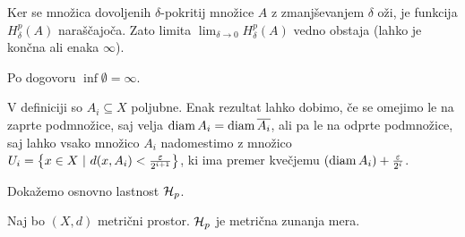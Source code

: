 \begin{opomba}
    Ker se množica dovoljenih \(\delta\)-pokritij množice \(A\) z zmanjševanjem \(\delta\) oži, je funkcija \(H^p_\delta(A)\) naraščajoča. Zato limita \(\lim_{\delta \to 0} H^p_\delta(A)\) vedno obstaja (lahko je končna ali enaka \(\infty\)).
\end{opomba}

\begin{opomba} 
    Po dogovoru \(\inf \emptyset = \infty\).
\end{opomba}

\begin{opomba}
    \label{odp-zap-haus}
    V definiciji so \(A_i \subseteq X\) poljubne. Enak rezultat lahko dobimo, če se omejimo le na zaprte podmnožice, saj velja \(\operatorname{diam} A_i = \operatorname{diam} \overline{A_i}\), ali pa le na odprte podmnožice, saj lahko vsako množico \(A_i\) nadomestimo z množico \(U_i = \left\{x \in X \ | \ d(x, A_i) < \frac{\varepsilon}{2^{i+1}}\right\}\), ki ima premer kvečjemu \((\operatorname{diam} A_i) + \frac{\varepsilon}{2^i}\).
\end{opomba}

Dokažemo osnovno lastnost \(\mathcal{H}_p\).
\begin{trditev}
    \label{haus-m-zun}
    Naj bo \((X, d)\) metrični prostor. \(\mathcal{H}_p\) je metrična zunanja mera.
\end{trditev}

